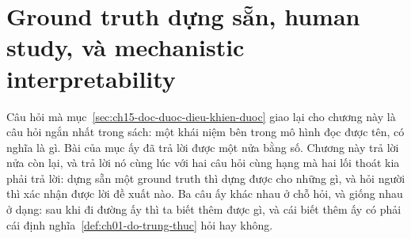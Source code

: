%
%
\chapter{Ground truth dựng sẵn, human study, và mechanistic interpretability}
\label{ch:ground-truth-dung-san}

Câu hỏi mà mục~\ref{sec:ch15-doc-duoc-dieu-khien-duoc} giao lại cho chương này
là câu hỏi ngắn nhất trong sách: một khái niệm bên trong mô hình đọc được tên,
có nghĩa là gì. Bài của mục ấy đã trả lời được một nửa bằng số. Chương này trả
lời nửa còn lại, và trả lời nó cùng lúc với hai câu hỏi cùng hạng mà hai lối
thoát kia phải trả lời: dựng sẵn một ground truth thì dựng được cho những gì, và
hỏi người thì xác nhận được lời đề xuất nào. Ba câu ấy khác nhau ở chỗ hỏi, và
giống nhau ở dạng: sau khi đi đường ấy thì ta biết thêm được gì, và cái biết
thêm ấy có phải cái định nghĩa~\ref{def:ch01-do-trung-thuc} hỏi hay không.

